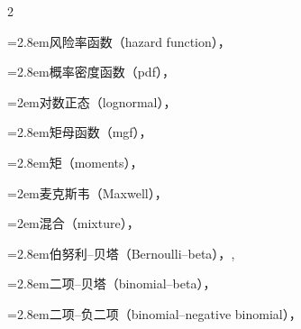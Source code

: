 \begin{multicols}{2}
\par\noindent\hangindent=2.8em\hspace*{1.8em}\label{idx:330}风险率函数（hazard function），\hyperref[idxocc:330:139]{\pageref*{idxocc:330:139}}\par
\par\noindent\hangindent=2.8em\hspace*{1.8em}\label{idx:331}概率密度函数（pdf），\hyperref[ex:1.6.4]{\pageref*{ex:1.6.4}}\par
\par\noindent\hangindent=2em\hspace*{1em}\label{idx:332}对数正态（lognormal），\hyperref[eq:3.3.21]{\pageref*{eq:3.3.21}}\par
\par\noindent\hangindent=2.8em\hspace*{1.8em}\label{idx:333}矩母函数（mgf），\hyperref[exercise:2.36]{\pageref*{exercise:2.36}}\par
\par\noindent\hangindent=2.8em\hspace*{1.8em}\label{idx:334}矩（moments），\hyperref[ex:2.3.10]{\pageref*{ex:2.3.10}}\par
\par\noindent\hangindent=2em\hspace*{1em}\label{idx:335}麦克斯韦（Maxwell），\hyperref[idxocc:335:139]{\pageref*{idxocc:335:139}}\par
\par\noindent\hangindent=2em\hspace*{1em}\label{idx:336}混合（mixture），\hyperref[def:4.4.4]{\pageref*{def:4.4.4}}\par
\par\noindent\hangindent=2.8em\hspace*{1.8em}\label{idx:337}伯努利–贝塔（Bernoulli–beta），\hyperref[ex:4.4.6]{\pageref*{ex:4.4.6}}, \hyperref[ex:4.4.8]{\pageref*{ex:4.4.8}}\par
\par\noindent\hangindent=2.8em\hspace*{1.8em}\label{idx:338}二项–贝塔（binomial–beta），\hyperref[exercise:4.34]{\pageref*{exercise:4.34}}\par
\par\noindent\hangindent=2.8em\hspace*{1.8em}\label{idx:339}二项–负二项（binomial–negative binomial），\hyperref[idxocc:339:167]{\pageref*{idxocc:339:167}}\par

\end{multicols}
